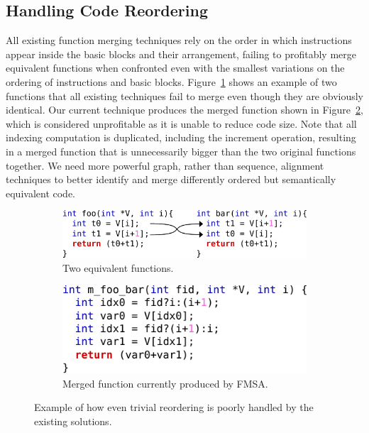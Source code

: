 \subsection{Handling Code Reordering}

All existing function merging techniques rely on the order in which instructions appear inside the basic blocks and their arrangement,
failing to profitably merge equivalent functions when confronted even with the smallest variations on the ordering of instructions and basic blocks.
Figure~\ref{fig:code-reordering} shows an example of two functions that all existing techniques fail to merge even though they are obviously identical.
Our current technique produces the merged function shown in Figure~\ref{fig:merged-code-reordering}, which is considered unprofitable as it is unable to reduce code size.
Note that all indexing computation is duplicated, including the increment operation, resulting in a merged function that is unnecessarily bigger than the two original functions together.
We need more powerful graph, rather than sequence, alignment techniques to better identify and merge differently ordered but semantically equivalent code.

\begin{figure}[h]
 \centering
 \begin{subfigure}{.5\textwidth}
         \centering
         \includegraphics[scale=0.85]{src/conclusion/figs/motivation-1-code.pdf}
         \vspace{1ex}
         \caption{Two equivalent functions.}
         \label{fig:code-reordering}
 \end{subfigure}\begin{subfigure}{.5\textwidth}
         \centering
         \includegraphics[scale=0.85]{src/conclusion/figs/motivation-1-merged-code.pdf}
         \caption{Merged function currently produced by FMSA.}
         \label{fig:merged-code-reordering}
 \end{subfigure}
    \vspace{-2ex}
    \caption{Example of how even trivial reordering is poorly handled by the existing solutions.}
    \label{fig:code-reordering-example}
\end{figure}

